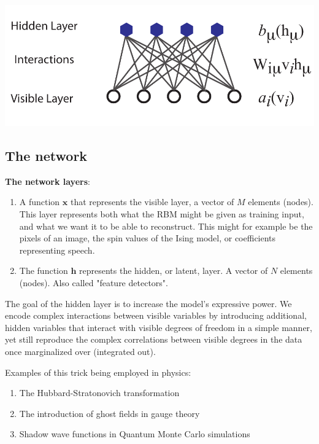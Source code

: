 \documentclass[%
oneside,                 %
final,                   %
10pt]{article}
\begin{document}
\vspace{6mm}

\centerline{\includegraphics[width=1.0\linewidth]{figures/RBM.pdf}}

\vspace{6mm}





\subsection{The network}

\textbf{The network layers}:
\begin{enumerate}
 \item A function $\mathbf{x}$ that represents the visible layer, a vector of $M$ elements (nodes). This layer represents both what the RBM might be given as training input, and what we want it to be able to reconstruct. This might for example be the pixels of an image, the spin values of the Ising model, or coefficients representing speech.

 \item The function $\mathbf{h}$ represents the hidden, or latent, layer. A vector of $N$ elements (nodes). Also called "feature detectors".
\end{enumerate}

\noindent
The goal of the hidden layer is to increase the model's expressive power. We encode complex interactions between visible variables by introducing additional, hidden variables that interact with visible degrees of freedom in a simple manner, yet still reproduce the complex correlations between visible degrees in the data once marginalized over (integrated out).

Examples of this trick being employed in physics: 
\begin{enumerate}
 \item The Hubbard-Stratonovich transformation

 \item The introduction of ghost fields in gauge theory

 \item Shadow wave functions in Quantum Monte Carlo simulations
\end{enumerate}
\end{document}
